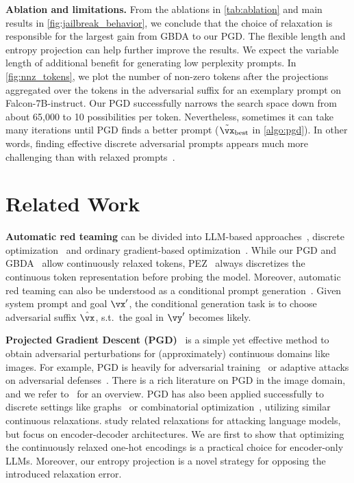 \documentclass{article}
\theoremstyle{plain}
\theoremstyle{definition}
\theoremstyle{remark}
\begin{document}
\textbf{Ablation and limitations.} From the ablations in \autoref{tab:ablation} and main results in \autoref{fig:jailbreak_behavior}, we conclude that the choice of relaxation is responsible for the largest gain from GBDA to our PGD. The flexible length and entropy projection can help further improve the results. We expect the variable length of additional benefit for generating low perplexity prompts. In \autoref{fig:nnz_tokens}, we plot the number of non-zero tokens after the projections aggregated over the tokens in the adversarial suffix for an exemplary prompt on Falcon-7B-instruct. Our PGD successfully narrows the search space down from about 65,000 to 10 possibilities per token. Nevertheless, sometimes it can take many iterations until PGD finds a better prompt (\(\tilde{\vx}_{\text{best}}\) in \autoref{algo:pgd}). In other words, finding effective discrete adversarial prompts appears much more challenging than with relaxed prompts~\citep{schwinn_adversarial_2023}.


\section{Related Work}\label{sec:appendix_related_work}

\textbf{Automatic red teaming} can be divided into LLM-based approaches~\citep{perez_red_2022, mehrotra_tree_2023, chao_jailbreaking_2023}, discrete optimization~\citep{wallace_universal_2021, shin_autoprompt_2020, zou_universal_2023} and ordinary gradient-based optimization~\citep{guo_gradient-based_2021, wen_hard_2023}. While our PGD and GBDA~\citep{guo_gradient-based_2021} allow continuously relaxed tokens, PEZ~\citep{wen_hard_2023} always discretizes the continuous token representation before probing the model. Moreover, automatic red teaming can also be understood as a conditional prompt generation~\citep{kumar_gradient-based_2022}. Given system prompt and goal \(\vx'\), the conditional generation task is to choose adversarial suffix \(\hat{\vx}\), s.t.\ the goal in \(\vy'\) becomes likely.

\textbf{Projected Gradient Descent (PGD)}~\citep{madry_towards_2018} is a simple yet effective method to obtain adversarial perturbations for (approximately) continuous domains like images. For example, PGD is heavily for adversarial training~\citep{madry_towards_2018} or adaptive attacks on adversarial defenses~\citep{tramer_adaptive_2020}. There is a rich literature on PGD in the image domain, and we refer to~\citet{chen_adversarial_2022, serban_adversarial_2020} for an overview. PGD has also been applied successfully to discrete settings like graphs~\citep{xu_topology_2019, geisler_robustness_2021,  gosch_adversarial_2023} or combinatorial optimization~\citep{geisler_generalization_2022}, utilizing similar continuous relaxations. \citet{hou_textgrad_2023} study related relaxations for attacking language models, but focus on encoder-decoder architectures. We are first to show that optimizing the continuously relaxed one-hot encodings is a practical choice for encoder-only LLMs. Moreover, our entropy projection is a novel strategy for opposing the introduced relaxation error.
\end{document}
